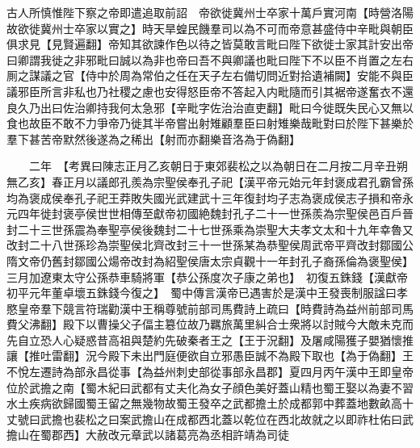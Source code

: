 古人所慎惟陛下察之帝即遣追取前詔　帝欲徙冀州士卒家十萬戶實河南【時營洛陽故欲徙冀州士卒家以實之】時天旱蝗民饑羣司以為不可而帝意甚盛侍中辛毗與朝臣俱求見【見賢遍翻】帝知其欲諫作色以待之皆莫敢言毗曰陛下欲徙士家其計安出帝曰卿謂我徙之非邪毗曰誠以為非也帝曰吾不與卿議也毗曰陛下不以臣不肖置之左右厠之謀議之官【侍中於周為常伯之任在天子左右備切問近對拾遺補闕】安能不與臣議邪臣所言非私也乃社稷之慮也安得怒臣帝不答起入内毗隨而引其裾帝遂奮衣不還良久乃出曰佐治卿持我何太急邪【辛毗字佐治治直吏翻】毗曰今徙既失民心又無以食也故臣不敢不力爭帝乃徙其半帝嘗出射雉顧羣臣曰射雉樂哉毗對曰於陛下甚樂於羣下甚苦帝默然後遂為之稀出【射而亦翻樂音洛為于偽翻】

　　二年　【考異曰陳志正月乙亥朝日于東郊裴松之以為朝日在二月按二月辛丑朔無乙亥】春正月以議郎孔羨為宗聖侯奉孔子祀【漢平帝元始元年封褒成君孔霸曾孫均為褒成侯奉孔子祀王莽敗失國光武建武十三年復封均子志為褒成侯志子損和帝永元四年徙封褒亭侯世世相傳至獻帝初國絶魏封孔子二十一世孫羨為宗聖侯邑百戶晉封二十三世孫震為奉聖亭侯後魏封二十七世孫乘為崇聖大夫孝文太和十九年幸魯又改封二十八世孫珍為崇聖侯北齊改封三十一世孫某為恭聖侯周武帝平齊改封鄒國公隋文帝仍舊封鄒國公煬帝改封為紹聖侯唐太宗貞觀十一年封孔子裔孫倫為褒聖侯】　三月加遼東太守公孫恭車騎將軍【恭公孫度次子康之弟也】　初復五銖錢【漢獻帝初平元年董卓壞五銖錢今復之】　蜀中傳言漢帝已遇害於是漢中王發喪制服諡曰孝愍皇帝羣下競言符瑞勸漢中王稱尊號前部司馬費詩上疏曰【時費詩為益州前部司馬費父沸翻】殿下以曹操父子偪主簒位故乃羈旅萬里糾合士衆將以討賊今大敵未克而先自立恐人心疑惑昔高祖與楚約先破秦者王之【王于況翻】及屠咸陽獲子嬰猶懷推讓【推吐雷翻】況今殿下未出門庭便欲自立邪愚臣誠不為殿下取也【為于偽翻】王不悅左遷詩為部永昌從事【為益州刺史部從事部永昌郡】夏四月丙午漢中王即皇帝位於武擔之南【蜀木紀曰武都有丈夫化為女子顔色美好蓋山精也蜀王娶以為妻不習水土疾病欲歸國蜀王留之無幾物故蜀王發卒之武都擔土於成都郭中葬蓋地數畝高十丈號曰武擔也裴松之曰案武擔山在成都西北蓋以乾位在西北故就之以即祚杜佑曰武擔山在蜀郡西】大赦改元章武以諸葛亮為丞相許靖為司徒

